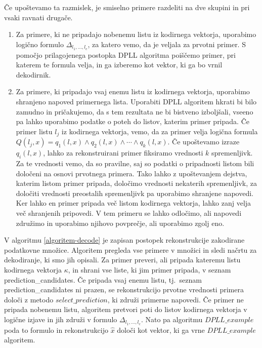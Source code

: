 \documentclass[12pt,a4paper]{article}
\begin{document}
Če upoštevamo ta razmislek, je smiselno primere razdeliti na dve skupini in pri vsaki ravnati drugače.
\begin{enumerate} %
	\item Za primere, ki ne pripadajo nobenemu listu iz kodirnega vektorja,
	uporabimo logično formulo $\Delta_{l_1,\ldots,l_c}$, za katero vemo, da je veljala za prvotni primer.
	S pomočjo prilagojenega postopka DPLL algoritma poiščemo primer, pri katerem te formula velja, in ga izberemo kot vektor, ki ga bo vrnil dekodirnik.

	\item Za primere, ki pripadajo vsaj enemu listu iz kodirnega vektorja, uporabimo shranjeno napoved primernega lista.
	Uporabiti DPLL algoritem hkrati bi bilo zamudno in pričakujemo, da s tem rezultata ne bi bistveno izboljšali, vseeno pa lahko uporabimo podatke o poteh do listov, katerim primer pripada.
	Če primer listu $l_j$ iz kodirnega vektorja, vemo, da za primer velja logična formula $Q(l_j,x) = q_1(l,x) \land q_2(l,x) \land \cdots \land q_k(l,x)$. %
	Če upoštevamo izraze $q_i(l,x)$, lahko za rekonstruirani primer fiksiramo vrednosti $k$ spremenljivk.
	Za te vrednosti vemo, da so pravilne, saj so podatki o pripadnosti listom bili določeni na osnovi prvotnega primera.
	Tako lahko z upoštevanjem dejstva, katerim listom primer pripada, določimo vrednosti nekaterih spremenljivk, za določiti vrednosti preostalih spremenljivk pa uporabimo shranjene napovedi.
	Ker lahko en primer pripada več listom kodirnega vektorja, lahko zanj velja več shranjenih pripovedi.
	V tem primeru se lahko odločimo, ali napovedi združimo in uporabimo njihovo povprečje, ali uporabimo zgolj eno.
\end{enumerate}

V algoritmu \ref{algoritem-decode} je zapisan postopek rekonstrukcije zakodirane podatkovne množice.
Algoritem pregleda vse primere v množici in sledi načrtu za dekodiranje, ki smo jih opisali.
Za primer preveri, ali pripada kateremu listu kodirnega vektorja $\kappa$, in shrani vse liste, ki jim primer pripada, v seznam prediction\_candidates.
Če pripada vsaj enemu listu, tj.~seznam prediction\_candidates ni prazen, se rekonstrukcijo prvotne vrednosti primera določi z metodo $select\_prediction$, ki združi primerne napovedi.
Če primer ne pripada nobenemu listu, algoritem pretvori poti do listov kodirnega vektorja v logične izjave in jih združi v formulo $\Delta_{l_1,\ldots,l_c}$.
Nato pa algoritmu $DPLL\_example$ poda to formulo in rekonstrukcijo $\hat{x}$ določi kot vektor, ki ga vrne $DPLL\_example$ algoritem. %
\end{document}
